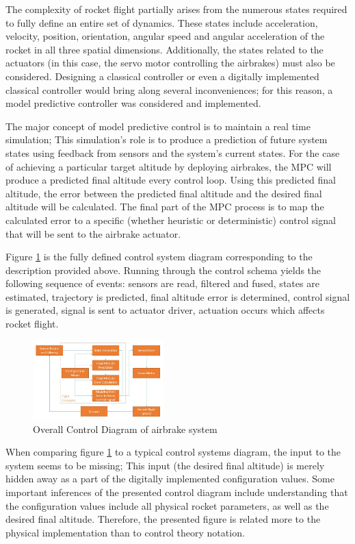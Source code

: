 \documentclass[conference, letterpaper]{IEEEtran}
\begin{document}
The complexity of rocket flight partially arises from the numerous states
required to fully define an entire set of dynamics. These states include
acceleration, velocity, position, orientation, angular speed and angular
acceleration of the rocket in all three spatial dimensions. Additionally,
the states related to the actuators (in this case, the servo motor controlling
the airbrakes) must also be considered. Designing a classical controller or even
a digitally implemented classical controller would bring along several
inconveniences; for this reason, a model predictive controller was considered
and implemented.

The major concept of model predictive control is to maintain a real time
simulation; This simulation's role is to produce a prediction of future system
states using feedback from sensors and the system's current states. For the case
of achieving a particular target altitude by deploying airbrakes, the MPC will
produce a predicted final altitude
every control loop. Using this predicted final altitude, the error between the
predicted final altitude and the desired final altitude will be calculated. The
final part of the MPC process is to map the calculated error to a specific
(whether heuristic or deterministic) control signal that will be sent to the
airbrake actuator.

Figure \ref{fig:MPC_diagram} is the fully defined control system diagram
corresponding to the description provided above. Running through the control
schema yields the following sequence of events: sensors are read, filtered and
fused, states are estimated, trajectory is predicted, final altitude error is
determined, control signal is generated, signal is sent to actuator driver,
actuation occurs which affects rocket flight.

\begin{figure}[H]
\centering
\includegraphics[width=0.45\textwidth]{./MPC_diagram}
\caption{Overall Control Diagram of airbrake system}
\label{fig:MPC_diagram}
\end{figure}

When comparing figure \ref{fig:MPC_diagram} to a
typical control systems diagram, the input to the system seems to be missing;
This input (the desired final altitude) is merely hidden away as a part of the
digitally implemented configuration values. Some important inferences of the
presented control diagram include understanding that the configuration values
include all physical rocket parameters, as well as the desired final altitude.
Therefore, the presented figure is related more to the physical implementation
than to control theory notation.
\end{document}
